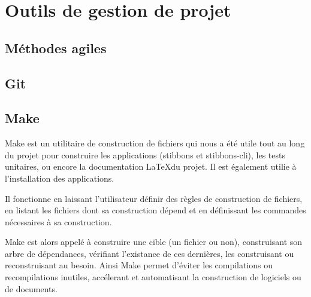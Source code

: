 \section{Outils de gestion de projet}

\subsection{Méthodes agiles}



\subsection{Git}


\subsection{Make}

Make est un utilitaire de construction de fichiers qui nous a été utile tout au long du projet pour construire les applications (stibbons et stibbons-cli), les tests unitaires, ou encore la documentation \LaTeX du projet. Il est également utilie à l'installation des applications.

Il fonctionne en laissant l'utilisateur définir des règles de construction de fichiers, en listant les fichiers dont sa construction dépend et en définissant les commandes nécessaires à sa construction.

Make est alors appelé à construire une cible (un fichier ou non), construisant son arbre de dépendances, vérifiant l'existance de ces dernières, les construisant ou reconstruisant au besoin. Ainsi Make permet d'éviter les compilations ou recompilations inutiles, accélerant et automatisant la construction de logiciels ou de documents.
